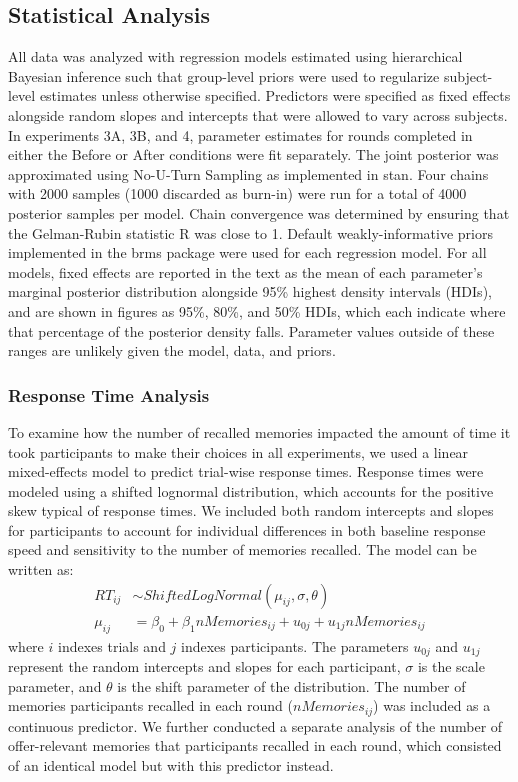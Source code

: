 \documentclass[10pt,letterpaper]{article}
\begin{document}
\subsection{Statistical Analysis}

All data was analyzed with regression models estimated using hierarchical Bayesian inference such that group-level priors were used to regularize subject-level estimates unless otherwise specified. Predictors were specified as fixed effects alongside random slopes and intercepts that were allowed to vary across subjects. In experiments 3A, 3B, and 4, parameter estimates for rounds completed in either the Before or After conditions were fit separately. The joint posterior was approximated using No-U-Turn Sampling as implemented in stan\cite{hoffmanNoUTurnSamplerAdaptively2014}. Four chains with 2000 samples (1000 discarded as burn-in) were run for a total of 4000 posterior samples per model. Chain convergence was determined by ensuring that the Gelman-Rubin statistic R was close to 1. Default weakly-informative priors implemented in the brms package were used for each regression model\cite{burknerBrmsPackageBayesian2017}. For all models, fixed effects are reported in the text as the mean of each parameter’s marginal posterior distribution alongside 95\% highest density intervals (HDIs), and are shown in figures as 95\%, 80\%, and 50\% HDIs, which each indicate where that percentage of the posterior density falls. Parameter values outside of these ranges are unlikely given the model, data, and priors.

\subsubsection{Response Time Analysis}

To examine how the number of recalled memories impacted the amount of time it took participants to make their choices in all experiments, we used a linear mixed-effects model to predict trial-wise response times. Response times were modeled using a shifted lognormal distribution, which accounts for the positive skew typical of response times. We included both random intercepts and slopes for participants to account for individual differences in both baseline response speed and sensitivity to the number of memories recalled. The model can be written as:
\begin{align*}
    RT_{ij} &\sim ShiftedLogNormal(\mu_{ij}, \sigma, \theta) \\
    \mu_{ij} &= \beta_0 + \beta_1nMemories_{ij} \nonumber + u_{0j} + u_{1j}nMemories_{ij}
\end{align*}
where $i$ indexes trials and $j$ indexes participants. The parameters $u_{0j}$ and $u_{1j}$ represent the random intercepts and slopes for each participant, $\sigma$ is the scale parameter, and $\theta$ is the shift parameter of the distribution. The number of memories participants recalled in each round ($nMemories_{ij}$) was included as a continuous predictor. We further conducted a separate analysis of the number of offer-relevant memories that participants recalled in each round, which consisted of an identical model but with this predictor instead. 
\end{document}
